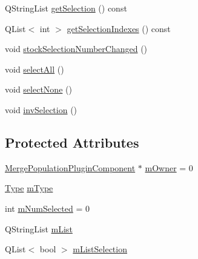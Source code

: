 \begin{DoxyCompactItemize}
\item 
Q\+String\+List \mbox{\hyperlink{class_merge_population_plugin_component_1_1_table_model_a9a7558301c9b16f82cbcaa716bb2c182}{get\+Selection}} () const
\item 
Q\+List$<$ int $>$ \mbox{\hyperlink{class_merge_population_plugin_component_1_1_table_model_a558b7ad773908355ef158bc26717f93a}{get\+Selection\+Indexes}} () const
\item 
void \mbox{\hyperlink{class_merge_population_plugin_component_1_1_table_model_a18b61f965d36a9afc4510ec3568779de}{stock\+Selection\+Number\+Changed}} ()
\item 
void \mbox{\hyperlink{class_merge_population_plugin_component_1_1_table_model_a199a8b39809d9701a470b58f769a5b0b}{select\+All}} ()
\item 
void \mbox{\hyperlink{class_merge_population_plugin_component_1_1_table_model_a951dbe976b18c5dc4379cbbf0e66dccb}{select\+None}} ()
\item 
void \mbox{\hyperlink{class_merge_population_plugin_component_1_1_table_model_a17997fa6ae97b91f29166d537f96a40c}{inv\+Selection}} ()
\end{DoxyCompactItemize}
\subsection*{Protected Attributes}
\begin{DoxyCompactItemize}
\item 
\mbox{\hyperlink{class_merge_population_plugin_component}{Merge\+Population\+Plugin\+Component}} $\ast$ \mbox{\hyperlink{class_merge_population_plugin_component_1_1_table_model_a3647f1410a1660c8a600452f209ad0ac}{m\+Owner}} = 0
\item 
\mbox{\hyperlink{class_merge_population_plugin_component_1_1_table_model_aedcae9b9dcacd928610323861dcb1258}{Type}} \mbox{\hyperlink{class_merge_population_plugin_component_1_1_table_model_a4615c664a4c2130cca4ee14b30106a51}{m\+Type}}
\item 
int \mbox{\hyperlink{class_merge_population_plugin_component_1_1_table_model_ae304857ac7d588874f3ad65cfd2b0bff}{m\+Num\+Selected}} = 0
\item 
Q\+String\+List \mbox{\hyperlink{class_merge_population_plugin_component_1_1_table_model_a45f105705a6a1ac16e0f5982701bdc0e}{m\+List}}
\item 
Q\+List$<$ bool $>$ \mbox{\hyperlink{class_merge_population_plugin_component_1_1_table_model_a0ce02205ce77fa10cba1a571d736c07a}{m\+List\+Selection}}
\end{DoxyCompactItemize}


